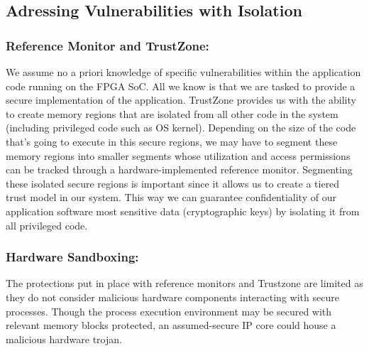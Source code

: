 \documentclass[sigconf]{acmart}
\theoremstyle{plain}
\theoremstyle{remark}
\begin{document}
\subsection{Adressing Vulnerabilities with Isolation}
\subsubsection{Reference Monitor and TrustZone:}
We assume no a priori knowledge of specific vulnerabilities within the application code running on the FPGA SoC. All we know is that we are tasked to provide a secure implementation of the application. TrustZone provides us with the ability to create memory regions that are isolated from all other code in the system (including privileged code such as OS kernel). Depending on the size of the code that's going to execute in this secure regions, we may have to segment these memory regions into smaller segments whose utilization and access permissions can be tracked through a hardware-implemented reference monitor. Segmenting these isolated secure regions is important since it allows us to create a tiered trust model in our system. This way we can guarantee confidentiality of our application software most sensitive data (cryptographic keys) by isolating it from all privileged code.


\subsubsection{Hardware Sandboxing:}
The protections put in place with reference monitors and Trustzone are limited as they do not consider malicious hardware components interacting with secure processes. Though the process execution environment may be secured with relevant memory blocks protected, an assumed-secure IP core could house a malicious hardware trojan.
\end{document}
